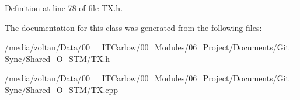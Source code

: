 Definition at line 78 of file T\+X.\+h.



The documentation for this class was generated from the following files\+:\begin{DoxyCompactItemize}
\item 
/media/zoltan/\+Data/00\+\_\+\_\+\+I\+T\+Carlow/00\+\_\+\+Modules/06\+\_\+\+Project/\+Documents/\+Git\+\_\+\+Sync/\+Shared\+\_\+\+O\+\_\+\+S\+T\+M/\hyperlink{_t_x_8h}{T\+X.\+h}\item 
/media/zoltan/\+Data/00\+\_\+\_\+\+I\+T\+Carlow/00\+\_\+\+Modules/06\+\_\+\+Project/\+Documents/\+Git\+\_\+\+Sync/\+Shared\+\_\+\+O\+\_\+\+S\+T\+M/\hyperlink{_t_x_8cpp}{T\+X.\+cpp}\end{DoxyCompactItemize}
